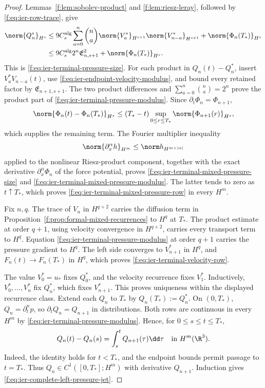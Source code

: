 \begin{proof}
Lemmas~\ref{f:lem:sobolev-product} and \ref{f:lem:riesz-leray}, followed by
\eqref{f:eq:ier-row-trace}, give
\begin{align*}
 \norm{Q_n^*}_{H^s}
 &\le9C_s^{\rm alg}\sum_{a=0}^{n}\binom na
 \norm{V_a^*}_{H^{s+1}}\norm{V_{n-a}^*}_{H^{s+1}}
 +\norm{\Phi_n(T_*)}_{H^s}\\
 &\le9C_s^{\rm alg}2^n\mathfrak E_{n,s+1}^2
 +\norm{\Phi_n(T_*)}_{H^s}.
\end{align*}
This is \eqref{f:eq:ier-terminal-pressure-size}.
For each product in \(Q_n(t)-Q_n^*\), insert
\(V_a^*V_{n-a}(t)\), use
\eqref{f:eq:ier-endpoint-velocity-modulus}, and bound every retained factor by
\(\mathfrak E_{n+1,s+1}\).  The two product differences and
\(\sum_{a=0}^{n}\binom na=2^n\) prove
the product part of \eqref{f:eq:ier-terminal-pressure-modulus}.  Since
\(\partial_t\Phi_n=\Phi_{n+1}\),
\[
 \norm{\Phi_n(t)-\Phi_n(T_*)}_{H^s}
 \le (T_*-t)\sup_{0\le r\le T_*}\norm{\Phi_{n+1}(r)}_{H^s},
\]
which supplies the remaining term.  The Fourier multiplier inequality
\[
 \norm{\partial_x^\alpha h}_{H^m}
 \le\norm h_{H^{m+|\alpha|}}
\]
applied to the nonlinear Riesz-product component, together with the exact
derivative \(\partial_x^\alpha\Phi_n\) of the force potential, proves
\eqref{f:eq:ier-terminal-mixed-pressure-size} and
\eqref{f:eq:ier-terminal-mixed-pressure-modulus}.  The latter tends to zero
as \(t\uparrow T_*\), which proves
\eqref{f:eq:ier-terminal-mixed-pressure-row} in every \(H^m\).

Fix \(n,q\).  The trace of \(V_n\) in \(H^{q+2}\) carries the diffusion
term in Proposition~\ref{f:prop:formal-mixed-recurrences} to \(H^q\) at
\(T_*\).  The product estimate at order \(q+1\), using velocity convergence
in \(H^{q+2}\), carries every transport term to \(H^q\).  Equation
\eqref{f:eq:ier-terminal-pressure-modulus} at order \(q+1\) carries the pressure
gradient to \(H^q\).  The left side converges to \(V_{n+1}^*\) in \(H^q\),
and \(F_n(t)\to F_n(T_*)\) in \(H^q\), which proves
\eqref{f:eq:ier-terminal-velocity-row}.

The value \(V_0^*=u_*\) fixes \(Q_0^*\), and the velocity recurrence fixes
\(V_1^*\).  Inductively, \(V_0^*,\ldots,V_n^*\) fix \(Q_n^*\), which fixes
\(V_{n+1}^*\).  This proves uniqueness within the displayed recurrence
class.  Extend each \(Q_n\) to \(T_*\) by
\(Q_n(T_*):=Q_n^*\).  On \((0,T_*)\),
\(Q_n=\partial_t^np\), so \(\partial_tQ_n=Q_{n+1}\) in distributions.
Both rows are continuous in every \(H^m\) by
\eqref{f:eq:ier-terminal-pressure-modulus}.  Hence, for
\(0\le s\le t\le T_*\),
\begin{equation}
 Q_n(t)-Q_n(s)=\int_s^tQ_{n+1}(\tau)\dd\tau
 \quad\text{in }H^m(\R^3).
 \label{f:eq:ier-pressure-banach-identity}
\end{equation}
Indeed, the identity holds for \(t<T_*\), and the endpoint bounds permit
passage to \(t=T_*\).  Thus
\(Q_n\in C^1([0,T_*];H^m)\) with derivative \(Q_{n+1}\).  Induction gives
\eqref{f:eq:ier-complete-left-pressure-jet}.
\end{proof}

